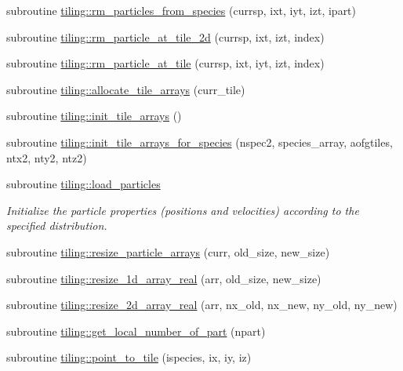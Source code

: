 \begin{DoxyCompactItemize}
\item 
subroutine \hyperlink{namespacetiling_a473875b1f5e9bc6b47ff5d088db15e58}{tiling\+::rm\+\_\+particles\+\_\+from\+\_\+species} (currsp, ixt, iyt, izt, ipart)
\item 
subroutine \hyperlink{namespacetiling_ad6083dac6e2eaccb762ecb829c954898}{tiling\+::rm\+\_\+particle\+\_\+at\+\_\+tile\+\_\+2d} (currsp, ixt, izt, index)
\item 
subroutine \hyperlink{namespacetiling_a7657907098a724d053d587ca73725958}{tiling\+::rm\+\_\+particle\+\_\+at\+\_\+tile} (currsp, ixt, iyt, izt, index)
\item 
subroutine \hyperlink{namespacetiling_aacbab18e61ac532ba396b41bab67a265}{tiling\+::allocate\+\_\+tile\+\_\+arrays} (curr\+\_\+tile)
\item 
subroutine \hyperlink{namespacetiling_a97b828159c1e05df8082c27f3aa61e13}{tiling\+::init\+\_\+tile\+\_\+arrays} ()
\item 
subroutine \hyperlink{namespacetiling_afe5a0a0a27fa1c078f8e69228d0d4a56}{tiling\+::init\+\_\+tile\+\_\+arrays\+\_\+for\+\_\+species} (nspec2, species\+\_\+array, aofgtiles, ntx2, nty2, ntz2)
\item 
subroutine \hyperlink{namespacetiling_ae5c4e98ae7e7957054dda03ab0e298f8}{tiling\+::load\+\_\+particles}
\begin{DoxyCompactList}\small\item\em Initialize the particle properties (positions and velocities) according to the specified distribution. \end{DoxyCompactList}\item 
subroutine \hyperlink{namespacetiling_aaa407b13d58fff3e54b191fa9a8962c0}{tiling\+::resize\+\_\+particle\+\_\+arrays} (curr, old\+\_\+size, new\+\_\+size)
\item 
subroutine \hyperlink{namespacetiling_ad65e35a84d2268ef2b6b4f97f38b18bc}{tiling\+::resize\+\_\+1d\+\_\+array\+\_\+real} (arr, old\+\_\+size, new\+\_\+size)
\item 
subroutine \hyperlink{namespacetiling_afa3d754a121460dce786357819629421}{tiling\+::resize\+\_\+2d\+\_\+array\+\_\+real} (arr, nx\+\_\+old, nx\+\_\+new, ny\+\_\+old, ny\+\_\+new)
\item 
subroutine \hyperlink{namespacetiling_af9f6fdf5c755688f10dc74ed3c363d85}{tiling\+::get\+\_\+local\+\_\+number\+\_\+of\+\_\+part} (npart)
\item 
subroutine \hyperlink{namespacetiling_a875e1671637fb100355fe099ef2a4f63}{tiling\+::point\+\_\+to\+\_\+tile} (ispecies, ix, iy, iz)

\end{DoxyCompactItemize}

